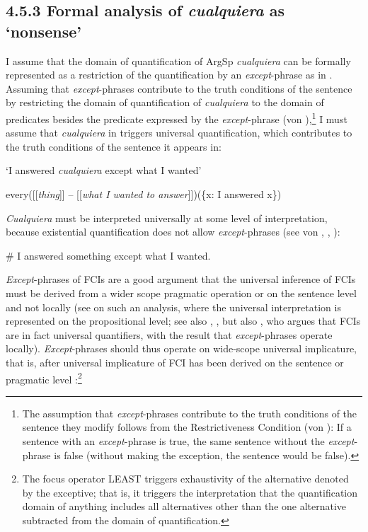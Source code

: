 \subsection{\textbf{4.5.3} \textbf{Formal} \textbf{analysis} \textbf{of} \textbf{\textit{cualquiera}} \textbf{as} \textbf{‘nonsense’}}

I assume that the domain of quantification of ArgSp \textit{cualquiera} can be formally represented as a restriction of the quantification by an \textit{except}{}-phrase as in . Assuming that \textit{except}{}-phrases contribute to the truth conditions of the sentence by restricting the domain of quantification of \textit{cualquiera} to the domain of predicates besides the predicate expressed by the \textit{except}{}-phrase (von \citealt{Fintel1994}),\footnote{{The assumption that} {\textit{except}}{{}-phrases contribute to the truth conditions of the sentence they modify follows from the Restrictiveness Condition (von \citealt{Fintel1994}): If a sentence with an} {\textit{except}}{{}-phrase is true, the same sentence without the} {\textit{except}}{{}-phrase is false (without making the exception, the sentence would be false).}} I must assume that \textit{cualquiera} in  triggers universal quantification, which contributes to the truth conditions of the sentence it appears in:

\label{bkm:Ref63461516}    ‘I answered \textit{cualquiera} except what I wanted’

every([[\textit{thing}]] – [[\textit{what I wanted to answer}]])(\{x: I answered x\})

\textit{Cualquiera} must be interpreted universally at some level of interpretation, because existential quantification does not allow \textit{except}{}-phrases (see von \citealt{Fintel1994}, \citealt{Arregui2006}, \citealt{Gajewski2008}):

  \#  I answered something except what I wanted.

\textit{Except}{}-phrases of FCIs are a good argument that the universal inference of FCIs must be derived from a wider scope pragmatic operation or on the sentence level and not locally (see  on such an analysis, where the universal interpretation is represented on the propositional level; see also \citealt{Chierchia2006}, \citealt{Gajewski2008}, but also \citealt{Dayal1998,Dayal2004}, who argues that FCIs are in fact universal quantifiers, with the result that \textit{except}{}-phrases operate locally). \textit{Except}{}-phrases should thus operate on wide-scope universal implicature, that is, after universal implicature of FCI has been derived on the sentence or pragmatic level \citep{Gajewski2008}:\footnote{{The focus operator LEAST triggers exhaustivity of the alternative denoted by the exceptive; that is, it triggers the interpretation that the quantification domain of anything includes all alternatives other than the one alternative subtracted from the domain of quantification.}}

